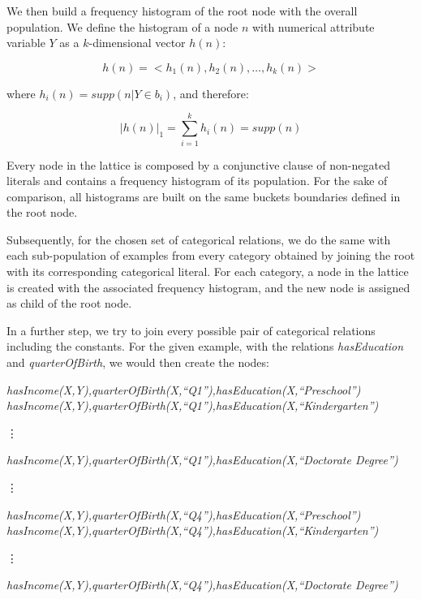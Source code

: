 We then build a frequency histogram of the root node with the overall population. We define the histogram of a
node $n$ with numerical attribute variable $Y$ as a $k$-dimensional vector $h(n)$:

\begin{equation}
 h(n)=<h_1(n),h_2(n),\ldots,h_k(n)>
\end{equation}

where $h_i(n)=supp(n|Y \in b_i)$, and therefore:

\begin{equation}
  |h(n)|_1=\sum_{i=1}^{k}h_i(n)=supp(n)
\end{equation}

Every node in the lattice is composed by a conjunctive clause of non-negated literals and contains a frequency histogram
of its population. For the sake of comparison, all histograms are built on the same buckets boundaries defined in the
root node. 

Subsequently, for the chosen set of categorical relations, we do the same with each sub-population of examples from
every category obtained by joining the root with its corresponding categorical literal. For each category, a node in
the lattice is created with the associated frequency histogram, and the new node is assigned as child of the root
node.

In a further step, we try to join every possible pair of categorical relations including the constants. For the
given example, with the relations \emph{hasEducation} and \emph{quarterOfBirth}, we would then create the nodes:

  \emph{hasIncome(X,Y),quarterOfBirth(X,``Q1''),hasEducation(X,``Preschool'')} \newline
  \emph{hasIncome(X,Y),quarterOfBirth(X,``Q1''),hasEducation(X,``Kindergarten'')} \newline
  \centerline{\vdots} 
  \emph{hasIncome(X,Y),quarterOfBirth(X,``Q1''),hasEducation(X,``Doctorate Degree'')} \newline

  \centerline{\vdots} 

  \emph{hasIncome(X,Y),quarterOfBirth(X,``Q4''),hasEducation(X,``Preschool'')} \newline
  \emph{hasIncome(X,Y),quarterOfBirth(X,``Q4''),hasEducation(X,``Kindergarten'')} \newline
  \centerline{\vdots} 
  \emph{hasIncome(X,Y),quarterOfBirth(X,``Q4''),hasEducation(X,``Doctorate Degree'')} \newline


